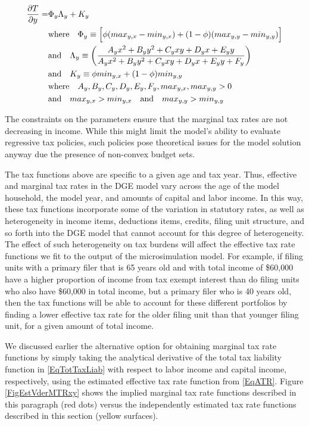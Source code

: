 \documentclass[letterpaper,12pt]{article}
\theoremstyle{definition}
\begin{document}
\begin{spacing}{1.5}
    \begin{equation}\label{EqMTR_cap}
      \begin{split}
       \frac{\partial T}{\partial y} = &\Phi_y\Lambda_y + K_y \\
        &\text{where}\quad \Phi_y \equiv \Bigl[\phi(max_{y,x} - min_{y,x}) + (1 - \phi)(max_{y,y} - min_{y,y})\Bigr] \\
        &\text{and}\quad \Lambda_y \equiv \biggl(\frac{A_y x^2 + B_y y^2 + C_y xy + D_y x + E_y y}{A_y x^2 + B_y y^2 + C_y xy + D_y x + E_y y + F_y}\biggr) \\
        &\text{and}\quad K_y \equiv \phi min_{y,x} + (1 - \phi)min_{y,y} \\
        &\text{where}\quad A_y,B_y,C_y,D_y,E_y,F_y,max_{y,x},max_{y,y} > 0 \\
        &\text{and}\quad max_{y,x} > min_{y,x} \quad\text{and}\quad max_{y,y} > min_{y,y}
      \end{split}
    \end{equation}

    The constraints on the parameters ensure that the marginal tax rates are not decreasing in income. While this might limit the model's ability to evaluate regressive tax policies, such policies pose theoretical issues for the model solution anyway due the presence of non-convex budget sets.

    The tax functions above are specific to a given age and tax year.  Thus, effective and marginal tax rates in the DGE model vary across the age of the model household, the model year, and amounts of capital and labor income. In this way, these tax functions incorporate some of the variation in statutory rates, as well as heterogeneity in income items, deductions items, credits, filing unit structure, and so forth into the DGE model that cannot account for this degree of heterogeneity. The effect of such heterogeneity on tax burdens will affect the effective tax rate functions we fit to the output of the microsimulation model. For example, if filing units with a primary filer that is 65 years old and with total income of \$60,000 have a higher proportion of income from tax exempt interest than do filing units who also have \$60,000 in total income, but a primary filer who is 40 years old, then the tax functions will be able to account for these different portfolios by finding a lower effective tax rate for the older filing unit than that younger filing unit, for a given amount of total income.

    We discussed earlier the alternative option for obtaining marginal tax rate functions by simply taking the analytical derivative of the total tax liability function in \eqref{EqTotTaxLiab} with respect to labor income and capital income, respectively, using the estimated effective tax rate function from \eqref{EqATR}. Figure \ref{FigEstVderMTRxy} shows the implied marginal tax rate functions described in this paragraph (red dots) versus the independently estimated tax rate functions described in this section (yellow surfaces).


\end{spacing}
\end{document}
